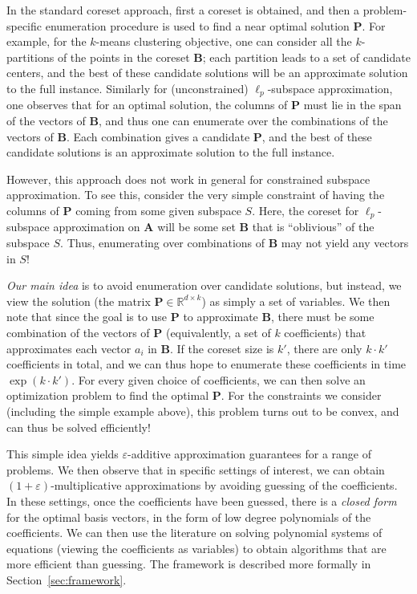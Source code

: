 \documentclass[11pt]{article}
\theoremstyle{plain}
\theoremstyle{plain}
\theoremstyle{definition}
\theoremstyle{plain}
\theoremstyle{remark}
\newcommand{\RR}{\mathbb{R}}
\begin{document}
In the standard coreset approach, first a coreset is obtained, and then a problem-specific enumeration procedure is used to find a near optimal solution $\bm{P}$. For example, for the $k$-means clustering objective, one can consider all the $k$-partitions of the points in the coreset $\bm{B}$; each partition leads to a set of candidate centers, and the best of these candidate solutions will be an approximate solution to the full instance. Similarly for (unconstrained) $\ell_p$-subspace approximation, one observes that for an optimal solution, the columns of $\bm{P}$ must lie in the span of the vectors of $\bm{B}$, and thus one can enumerate over the combinations of the vectors of $\bm{B}$. Each combination gives a candidate $\bm{P}$, and the best of these candidate solutions is an approximate solution to the full instance.

However, this approach does not work in general for constrained subspace approximation. To see this, consider the very simple constraint of having the columns of $\bm{P}$ coming from some given subspace $S$. Here, the coreset for $\ell_p$-subspace approximation on $\bm{A}$ will be some set $\bm{B}$ that is ``oblivious'' of the subspace $S$. Thus, enumerating over combinations of $\bm{B}$ may not yield any vectors in $S$! 

\emph{Our main idea} is to avoid enumeration over candidate solutions, but instead, we view the solution (the matrix $\bm{P} \in \RR^{d \times k}$) as simply a set of variables. We then note that since the goal is to use $\bm{P}$ to approximate $\bm{B}$, there must be some combination of the vectors of $\bm{P}$ (equivalently, a set of $k$ coefficients) that approximates each vector $a_i$ in $\bm{B}$. If the coreset size is $k'$, there are only $k \cdot k'$ coefficients in total, and we can thus hope to enumerate these coefficients in time $\exp(k \cdot k')$. For every given choice of coefficients, we can then solve an optimization problem to find the optimal $\bm{P}$. For the constraints we consider (including the simple example above), this problem turns out to be convex, and can thus be solved efficiently!

This simple idea yields $\varepsilon$-additive approximation guarantees for a range of problems. We then observe that in specific settings of interest, we can obtain $(1+\varepsilon)$-multiplicative approximations by avoiding guessing of the coefficients. In these settings, once the coefficients have been guessed, there is a \emph{closed form} for the optimal basis vectors, in the form of low degree polynomials of the coefficients. We can then use the literature on solving polynomial systems of equations (viewing the coefficients as variables) to obtain algorithms that are more efficient than guessing. The framework is described more formally in Section~\ref{sec:framework}. 
\end{document}
